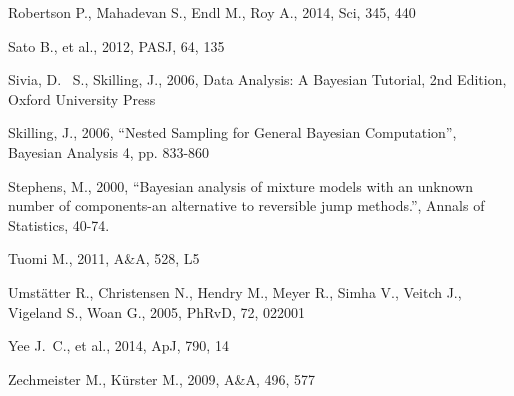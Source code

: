 \documentclass[useAMS,usenatbib]{mn2e}
\begin{document}
\begin{thebibliography}{99}
 Robertson P., Mahadevan S., Endl M., Roy 
A., 2014, Sci, 345, 440 

Sato B., et al., 2012, PASJ, 64, 135 

 Sivia, 
D.~ S., Skilling, J., 2006, Data Analysis: A Bayesian Tutorial, 2nd 
Edition, Oxford University Press

 Skilling, 
J., 2006, ``Nested Sampling for General Bayesian Computation'', Bayesian 
Analysis 4, pp. 833-860

 Stephens, M., 2000, ``Bayesian analysis of mixture models with an unknown number of components-an alternative to reversible jump methods.'', Annals of Statistics, 40-74.

 Tuomi M., 2011, A\&A, 528, L5 

 Umst{\"a}tter R., Christensen N., Hendry 
M., Meyer R., Simha V., Veitch J., Vigeland S., Woan G., 2005, PhRvD, 72, 
022001 

Yee J.~C., et al., 2014, ApJ, 790, 14 

 Zechmeister M., K{\"u}rster M., 2009, A\&A, 496, 577  

\end{thebibliography}
\end{document}
